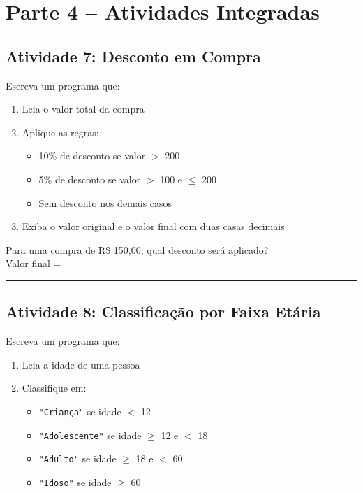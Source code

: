 \documentclass[12pt]{article}
\begin{document}
\section*{Parte 4 -- Atividades Integradas}

\subsection*{Atividade 7: Desconto em Compra}
Escreva um programa que:
\begin{enumerate}
    \item Leia o valor total da compra
    \item Aplique as regras:
    \begin{itemize}
        \item 10\% de desconto se valor $>$ 200
        \item 5\% de desconto se valor $>$ 100 e $\leq$ 200
        \item Sem desconto nos demais casos
    \end{itemize}
    \item Exiba o valor original e o valor final com duas casas decimais
\end{enumerate}

\begin{fixacaobox}
Para uma compra de R\$ 150,00, qual desconto será aplicado? \\[4pt]
Valor final = \rule{5cm}{0.4pt}
\end{fixacaobox}

\subsection*{Atividade 8: Classificação por Faixa Etária}
Escreva um programa que:
\begin{enumerate}
    \item Leia a idade de uma pessoa
    \item Classifique em:
    \begin{itemize}
        \item \texttt{"Criança"} se idade $<$ 12
        \item \texttt{"Adolescente"} se idade $\geq$ 12 e $<$ 18
        \item \texttt{"Adulto"} se idade $\geq$ 18 e $<$ 60
        \item \texttt{"Idoso"} se idade $\geq$ 60
    \end{itemize}
\end{enumerate}
\end{document}
